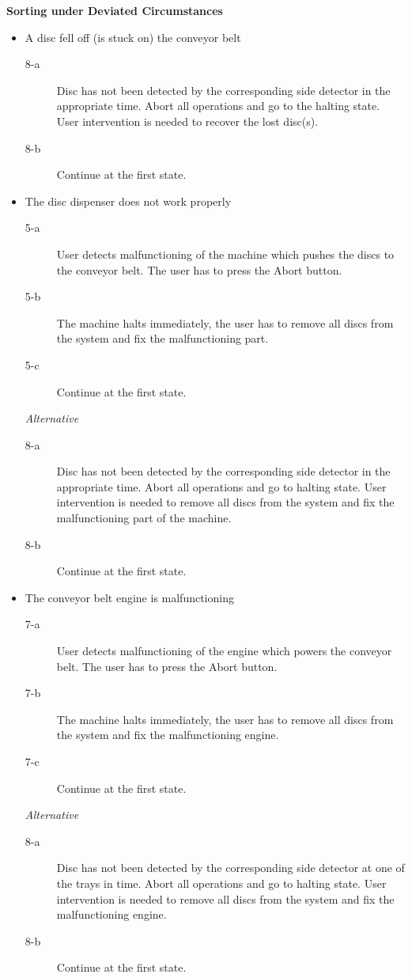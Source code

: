 \documentclass[a4paper,oneside,11pt]{report}
\begin{document}
\textbf{Sorting under Deviated Circumstances}
\begin{itemize}
\item A disc fell off (is stuck on) the conveyor belt
    \begin{description}
        \item[8-a] Disc has not been detected by the corresponding side detector in the appropriate time. Abort all operations and go to the halting state. User intervention is needed to recover the lost disc(s).
        \item[8-b] Continue at the first state.
    \end{description}

\item The disc dispenser does not work properly
    \begin{description}
        \item[5-a] User detects malfunctioning of the machine which pushes the discs to the conveyor belt. The user has to press the Abort button.
        \item[5-b] The machine halts immediately, the user has to remove all discs from the system and fix the malfunctioning part.
        \item[5-c] Continue at the first state.
    \end{description}
    \textit{Alternative}
    \begin{description}
        \item[8-a] Disc has not been detected by the corresponding side detector in the appropriate time. Abort all operations and go to halting state. User intervention is needed to remove all discs from the system and fix the malfunctioning part of the machine.
        \item[8-b] Continue at the first state.
    \end{description}

\item The conveyor belt engine is malfunctioning
    \begin{description}
        \item[7-a] User detects malfunctioning of the engine which powers the conveyor belt. The user has to press the Abort button.
        \item[7-b] The machine halts immediately, the user has to remove all discs from the system and fix the malfunctioning engine.
        \item[7-c] Continue at the first state.
    \end{description}
    \textit{Alternative}
    \begin{description}
        \item[8-a] Disc has not been detected by the corresponding side detector at one of the trays in time. Abort all operations and go to halting state. User intervention is needed to remove all discs from the system and fix the malfunctioning engine.
        \item[8-b] Continue at the first state.
    \end{description}
\end{itemize}
\end{document}
